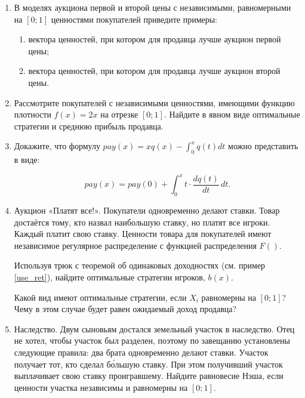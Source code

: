 \begin{enumerate}
\item В моделях аукциона первой и второй цены с независимыми, равномерными на $ [0;1] $ ценностями покупателей приведите примеры:
\begin{enumerate}
\item вектора ценностей, при котором для продавца лучше аукцион первой цены;
\item вектора ценностей, при котором для продавца лучше аукцион второй цены.
\end{enumerate}


\item Рассмотрите покупателей с независимыми ценностями, имеющими функцию плотности $ f(x)=2x $ на отрезке $ [0;1] $. Найдите в явном виде оптимальные стратегии и среднюю прибыль продавца.



\item Докажите, что формулу $ pay(x)=xq(x)-\int_{0}^{x}q(t)dt$ можно представить в виде:

\begin{equation}
pay(x)=pay(0)+\int_{0}^{x}t \cdot \frac{dq(t)}{dt}\, dt.
\end{equation}



\item Аукцион «Платят все!». Покупатели одновременно делают ставки. Товар достаётся тому, кто назвал наибольшую ставку, но платят все игроки. Каждый платит свою ставку. Ценности товара для покупателей имеют независимое регулярное распределение с функцией распределения $ F() $.

Используя трюк с теоремой об одинаковых доходностях (см. пример \ref{use_ret}), найдите оптимальные стратегии игроков, $ b(x) $.

Какой вид имеют оптимальные стратегии, если $ X_{i} $ равномерны на $ [0;1] $? Чему в этом случае будет равен ожидаемый доход продавца?




\item Наследство. Двум сыновьям достался земельный участок в наследство. Отец не хотел, чтобы участок был разделен, поэтому по завещанию установлены следующие правила: два брата одновременно делают ставки. Участок получает тот, кто сделал б\'{о}льшую ставку. При этом получивший участок выплачивает свою ставку проигравшему. Найдите равновесие Нэша, если ценности участка независимы и равномерны на $ [0;1] $.


\end{enumerate}
